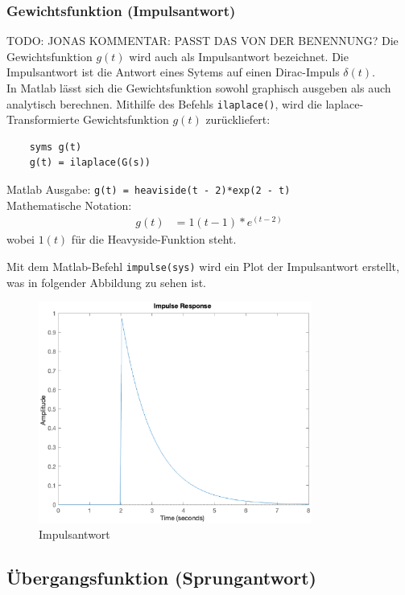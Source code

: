 \subsubsection{Gewichtsfunktion (Impulsantwort)}
TODO: JONAS KOMMENTAR: PASST DAS VON DER BENENNUNG?
Die Gewichtsfunktion $g(t)$ wird auch als Impulsantwort bezeichnet.
Die Impulsantwort ist die Antwort eines Sytems auf einen Dirac-Impuls $\delta(t)$.\\
In Matlab lässt sich die Gewichtsfunktion sowohl graphisch ausgeben als auch analytisch berechnen.
Mithilfe des Befehls \texttt{ilaplace()}, wird die laplace-Transformierte  Gewichtsfunktion $g(t)$ zurückliefert:
\begin{verbatim}
    syms g(t)
    g(t) = ilaplace(G(s))
\end{verbatim}

Matlab Ausgabe: \texttt{g(t) = heaviside(t - 2)*exp(2 - t)}\\
Mathematische Notation: 
\begin{align*}
    g(t) &=1(t-1)*e^{(t-2)}
\end{align*} wobei $1(t)$ für die Heavyside-Funktion steht.

Mit dem Matlab-Befehl \texttt{impulse(sys)} wird ein Plot der Impulsantwort erstellt, was in folgender Abbildung zu sehen ist. 

\begin{figure}[H]
    \label{fig:impuls}
    \centering
    \includegraphics[width=0.8\textwidth]{Bilder/ImpulsAntwortPT1Tt.eps}
    \caption{Impulsantwort}
 \end{figure}

\subsection{Übergangsfunktion (Sprungantwort)}

